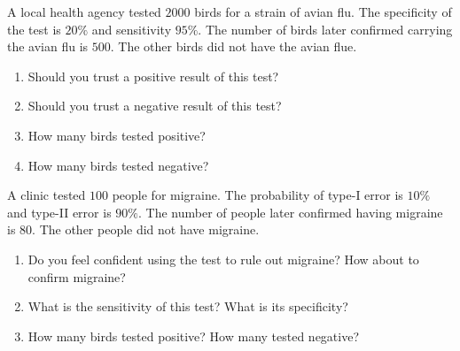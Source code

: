 \documentclass[../main.tex]{subfiles}
\begin{document}
\begin{example}
  A local health agency tested \(2000\) birds for a strain of avian flu.  The specificity of the test is \(20\%\) and sensitivity \(95\%\).  The number of birds later confirmed carrying the avian flu is \(500\). The other birds did not have the avian flue.

  \begin{enumerate}[wide]
    \item Should you trust a positive result of this test?
    \item Should you trust a negative result of this test?
    \item How many birds tested positive?
    \item How many birds tested negative?
  \end{enumerate}
\end{example}
\clearpage

\begin{example}
  A clinic tested \(100\) people for migraine.  The probability of type-I error is \(10\%\) and type-II error is \(90\%\).  The number of people later confirmed having migraine is \(80\). The other people did not have migraine.

  \begin{enumerate}[wide]
    \item Do you feel confident using the test to rule out migraine? How about to confirm migraine?
    \item What is the sensitivity of this test? What is its specificity?
    \item How many birds tested positive? How many tested negative?
  \end{enumerate}
\end{example}
\end{document}

